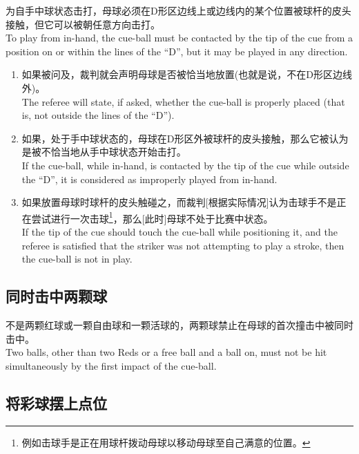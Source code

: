 \noindent 为自手中球状态击打，母球必须在D形区边线上或边线内的某个位置被球杆的皮头接触，但它可以被朝任意方向击打。\\
To play from in-hand, the cue-ball must be contacted by the tip of the cue from a position on or within the lines of the “D”, but it may be played in any direction.
\begin{enumerate}[label=(\alph*)]
    \item 如果被问及，裁判就会声明母球是否被恰当地放置(也就是说，不在D形区边线外)。\\
    The referee will state, if asked, whether the cue-ball is properly placed (that is, not outside the lines of the “D”).
    \item 如果，处于手中球状态的，母球在D形区外被球杆的皮头接触，那么它被认为是被不恰当地从手中球状态开始击打。\\
    If the cue-ball, while in-hand, is contacted by the tip of the cue while outside the “D”, it is considered as improperly played from in-hand.
    \item 如果放置母球时球杆的皮头触碰之，而裁判[根据实际情况]认为击球手不是正在尝试进行一次击球\footnote{例如击球手是正在用球杆拨动母球以移动母球至自己满意的位置。}，那么[此时]母球不处于比赛中状态。\\
    If the tip of the cue should touch the cue-ball while positioning it, and the referee is satisfied that the striker was not attempting to play a stroke, then the cue-ball is not in play.
\end{enumerate}

\subsection{同时击中两颗球}

\noindent 不是两颗红球或一颗自由球和一颗活球的，两颗球禁止在母球的首次撞击中被同时击中。\\
Two balls, other than two Reds or a free ball and a ball on, must not be hit simultaneously by the first impact of the cue-ball.

\subsection{将彩球摆上点位}\label{2237}

